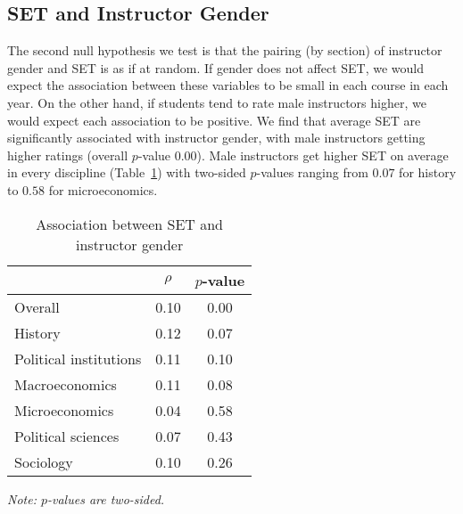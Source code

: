 \documentclass[12pt]{article}
\begin{document}
\subsection{SET and Instructor Gender}
The second null hypothesis we test is that the pairing (by section) of 
instructor gender and SET is as if at random.
If gender does not affect SET, we would expect the association between these
variables to be small in each course in each year.
On the other hand, if students tend to rate male instructors higher, we would
expect each association to be positive.
We find that average SET are significantly associated with instructor gender, with male instructors
getting higher ratings (overall $p$-value 0.00). 
Male instructors get higher SET on average in every discipline  (Table~\ref{tab:instructorgender})
with two-sided $p$-values ranging from $0.07$ for history to $0.58$ for microeconomics.

\begin{table}[htbp]
  \centering
  \footnotesize 
  \caption{Association between SET and instructor gender}
    \begin{tabular}{lcc}
    \toprule 
                          & $\rho$  & $p$-value     \\
   \midrule
    Overall &                 0.10       & 0.00     \\
    History &                 0.12       & 0.07     \\
    Political institutions &  0.11       & 0.10     \\
    Macroeconomics &          0.11       & 0.08     \\
    Microeconomics &          0.04       & 0.58     \\
    Political sciences &      0.07       & 0.43     \\
    Sociology &               0.10       & 0.26     \\
    \bottomrule
    \end{tabular}%
 \label{tab:instructorgender}%
  
  \textit{Note: $p$-values are two-sided.}
\end{table}%
\normalsize
\end{document}
